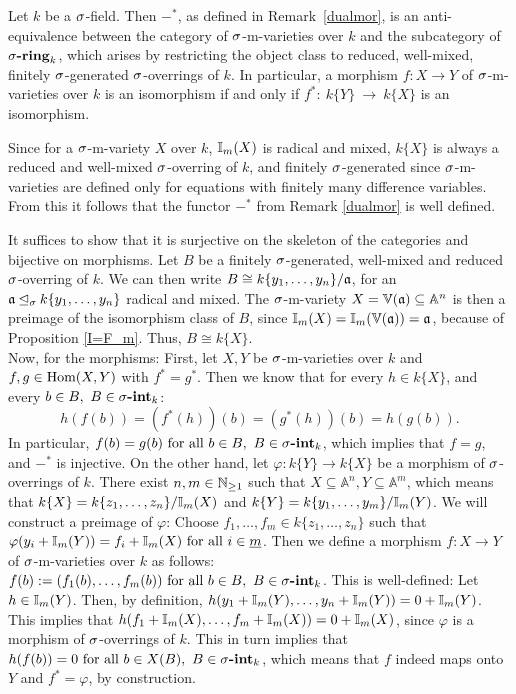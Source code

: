 \begin{prop}\label{dualisequiv}
Let $k$ be a $\sigma$-field. Then $-^*$, as defined in Remark~\ref{dualmor}, is an anti-equivalence between the category of $\sigma$-m-varieties over $k$ and the subcategory of $\sigma\text{{\normalfont\textbf{-ring}}}_k$, which arises by restricting the object class to reduced, well-mixed, finitely $\sigma$-generated $\sigma$-overrings of $k$. 
In particular, a morphism $f: X \rightarrow Y$ of $\sigma$-m-varieties over $k$ is an isomorphism if and only if $f^*:~k\{Y\}~\rightarrow~k\{X\}$ is an isomorphism.
\begin{bew}
Since for a $\sigma$-m-variety $X$ over $k$, $\mathbb{I}_m(X)$ is radical and mixed, $k\{X\}$ is always a reduced and well-mixed $\sigma$-overring of $k$, 
and finitely $\sigma$-generated since $\sigma$-m-varieties are defined only for equations with finitely many difference variables. From this it follows that the functor $-^*$ from Remark \ref{dualmor} is well defined. 

It suffices to show that it is surjective on the skeleton of the categories and bijective on morphisms. 
Let $B$ be a finitely $\sigma$-generated, well-mixed and reduced $\sigma$-overring of $k$. We can then write $B \cong k\{y_1,\ldots,y_n\}/\mathfrak{a}$, for an $\mathfrak{a} \unlhd_{\sigma} k\{y_1,\ldots,y_n\}$ radical and mixed. The $\sigma$-m-variety $X = \mathbb{V}(\mathfrak{a}) \subseteq \mathbb{A}^n$
is then a preimage of the isomorphism class of $B$, since $\mathbb{I}_m(X) = \mathbb{I}_m(\mathbb{V}(\mathfrak{a})) = \mathfrak{a}$, because of Proposition \ref{I=F_m}. Thus, $B \cong k\{X\}$. \\
\indent Now, for the morphisms: First, let $X,Y$ be $\sigma$-m-varieties over $k$ and $f,g \in \text{Hom}(X,Y)$ with $f^* = g^*$. Then we know that for every $h \in k\{X\}$, and every $b \in B, ~ B \in \sigma\text{{\normalfont\textbf{-int}}}_k$:
\[ h(f(b)) = (f^*(h))(b) = (g^*(h))(b) = h(g(b)). \]
In particular, $f(b) = g(b) \text{ for all } b \in B, ~ B \in \sigma\text{{\normalfont\textbf{-int}}}_k$, which implies that $f = g$, and $-^*$ is injective. 
On the other hand, let $\varphi: k\{Y\} \rightarrow k\{X\}$ be a morphism of $\sigma$-overrings of $k$. There exist $n,m \in \mathbb{N}_{\geq1}$ such that $X \subseteq \mathbb{A}^n, Y \subseteq \mathbb{A}^m$,
 which means that $k\{X\} = k\{z_1,\ldots,z_n\}/\mathbb{I}_m(X)$ and $k\{Y\} = k\{y_1,\ldots,y_m\}/\mathbb{I}_m(Y)$. We will construct a preimage of $\varphi$: Choose $f_1,\ldots,f_m \in k\{z_1,\ldots,z_n\}$ such that $\varphi(y_i + \mathbb{I}_m(Y)) = f_i + \mathbb{I}_m(X) \text{ for all } i \in \underline{m}$.
Then we define a morphism $f: X \rightarrow Y$ of $\sigma$-m-varieties over $k$ as follows: $f(b) := (f_1(b),\ldots,f_m(b)) \text{ for all } b \in B, ~ B \in \sigma\text{{\normalfont\textbf{-int}}}_k$. This is well-defined: Let $h \in \mathbb{I}_m(Y)$. Then, by definition, $h(y_1 + \mathbb{I}_m(Y),\ldots,y_n + \mathbb{I}_m(Y)) = 0 + \mathbb{I}_m(Y)$.
This implies that $h(f_1 + \mathbb{I}_m(X),\ldots,f_m + \mathbb{I}_m(X)) = 0 + \mathbb{I}_m(X)$, since $\varphi$ is a morphism of $\sigma$-overrings of $k$. This in turn implies that $h(f(b)) = 0 \text{ for all } b \in X(B), ~ B \in \sigma\text{{\normalfont\textbf{-int}}}_k$, which means that $f$ indeed maps onto $Y$ and $f^* = \varphi$, by construction.
\end{bew}
\end{prop}

